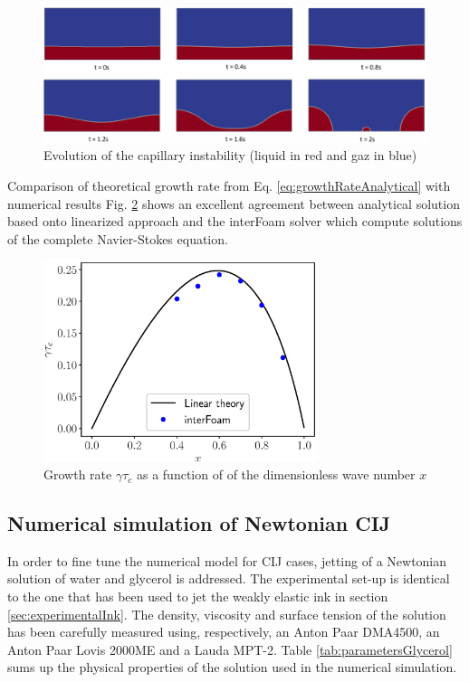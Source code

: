 \documentclass[twocolumn,10pt]{asme2ej}
\begin{document}
\begin{figure}[t]
    \centering
    \includegraphics[width=\textwidth]{pinch.png}
    \caption{Evolution of the capillary instability (liquid in red and gaz in blue)} 
    \label{fig:capillaryGrowth}
\end{figure}

Comparison of theoretical growth rate from Eq. \ref{eq:growthRateAnalytical} with numerical results Fig. \ref{fig:growthrate} shows an excellent agreement between analytical solution based onto linearized approach and the interFoam solver which compute solutions of the complete Navier-Stokes equation.

\begin{figure}[h]
    \centering
    \includegraphics[width=8cm]{dispersion.eps}
    \caption{Growth rate $\gamma \tau_c$ as a function of of the dimensionless wave number $x$}
    \label{fig:growthrate}
\end{figure}

\subsection{Numerical simulation of Newtonian CIJ}\label{sec:glycerol}
In order to fine tune the numerical model for CIJ cases, jetting of a Newtonian solution of water and glycerol is addressed. The experimental set-up is identical to the one that has been used to jet the weakly elastic ink in section \ref{sec:experimentalInk}. The density, viscosity and surface tension of the solution has been carefully measured using, respectively, an Anton Paar DMA4500, an Anton Paar Lovis 2000ME and a Lauda MPT-2. Table \ref{tab:parametersGlycerol} sums up the physical properties of the solution used in the numerical simulation.
\end{document}
